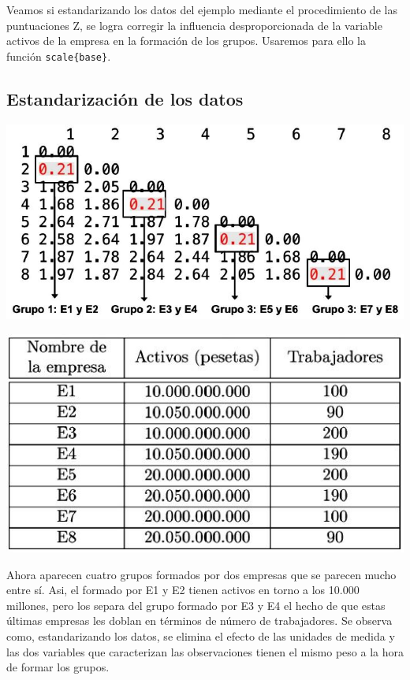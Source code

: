 \documentclass[]{article}
\begin{document}
\hypertarget{right}{}
Veamos si estandarizando los datos del ejemplo mediante el procedimiento
de las puntuaciones Z, se logra corregir la influencia desproporcionada
de la variable activos de la empresa en la formación de los grupos.
Usaremos para ello la función \texttt{scale\{base\}}.

\subsection{Estandarización de los
datos}\label{estandarizaciuxf3n-de-los-datos-6}

\hypertarget{left}{}
\includegraphics[width=1\linewidth]{images/dist_est}

\includegraphics[width=1\linewidth]{images/empresa}

\hypertarget{right}{}
Ahora aparecen cuatro grupos formados por dos empresas que se parecen
mucho entre sí. Asi, el formado por E1 y E2 tienen activos en torno a
los 10.000 millones, pero los separa del grupo formado por E3 y E4 el
hecho de que estas últimas empresas les doblan en términos de número de
trabajadores. Se observa como, estandarizando los datos, se elimina el
efecto de las unidades de medida y las dos variables que caracterizan
las observaciones tienen el mismo peso a la hora de formar los grupos.
\end{document}
